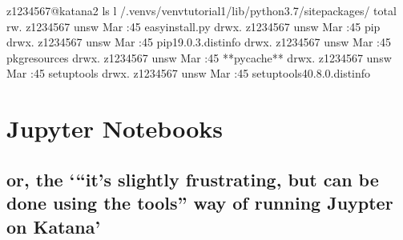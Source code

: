 \documentclass[letterpaper,10pt,english]{sphinxmanual}
\begin{document}
\begin{sphinxVerbatim}[commandchars=\\\{\}]
\PYG{o}{[}z1234567@katana2 \PYGZti{}\PYG{o}{]}\PYGZdl{} ls \PYGZhy{}l \PYGZti{}/.venvs/venv\PYGZhy{}tutorial\PYGZhy{}1/lib/python3.7/site\PYGZhy{}packages/
total 
\PYGZhy{}rw\PYGZhy{}\PYGZhy{}\PYGZhy{}\PYGZhy{}\PYGZhy{}\PYGZhy{}\PYGZhy{}.  z1234567 unsw   Mar  :45 easy\PYGZus{}install.py
drwx\PYGZhy{}\PYGZhy{}\PYGZhy{}\PYGZhy{}\PYGZhy{}\PYGZhy{}.  z1234567 unsw    Mar  :45 pip
drwx\PYGZhy{}\PYGZhy{}\PYGZhy{}\PYGZhy{}\PYGZhy{}\PYGZhy{}.  z1234567 unsw  Mar  :45 pip\PYGZhy{}19.0.3.dist\PYGZhy{}info
drwx\PYGZhy{}\PYGZhy{}\PYGZhy{}\PYGZhy{}\PYGZhy{}\PYGZhy{}.  z1234567 unsw    Mar  :45 pkg\PYGZus{}resources
drwx\PYGZhy{}\PYGZhy{}\PYGZhy{}\PYGZhy{}\PYGZhy{}\PYGZhy{}.  z1234567 unsw    Mar  :45 **pycache**
drwx\PYGZhy{}\PYGZhy{}\PYGZhy{}\PYGZhy{}\PYGZhy{}\PYGZhy{}.  z1234567 unsw  Mar  :45 setuptools
drwx\PYGZhy{}\PYGZhy{}\PYGZhy{}\PYGZhy{}\PYGZhy{}\PYGZhy{}.  z1234567 unsw  Mar  :45 setuptools\PYGZhy{}40.8.0.dist\PYGZhy{}info
\end{sphinxVerbatim}


\section{Jupyter Notebooks}
\label{\detokenize{software/python-jupyter-notebooks:jupyter-notebooks}}\label{\detokenize{software/python-jupyter-notebooks::doc}}

\subsection{or, the ‘“it’s slightly frustrating, but can be done using the tools” way of running Juypter on Katana’}
\label{\detokenize{software/python-jupyter-notebooks:or-the-it-s-slightly-frustrating-but-can-be-done-using-the-tools-way-of-running-juypter-on-katana}}
\end{document}
